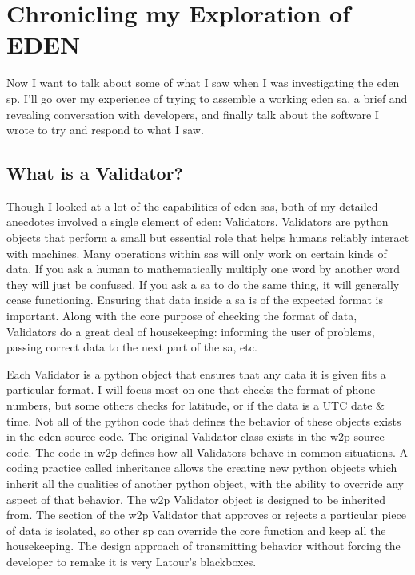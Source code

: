 \documentclass[a4paper,man,natbib,floatsintext]{apa6}
\begin{document}
  \section{Chronicling my Exploration of EDEN}
  Now I want to talk about some of what I saw when I was investigating the \acrshort{eden} \gls{sp}. I'll go over my experience of trying to assemble a working \acrshort{eden} \gls{sa}, a brief and revealing conversation with developers, and finally talk about the software I wrote to try and respond to what I saw.

  \subsection{What is a Validator?}
  Though I looked at a lot of the capabilities of \acrshort{eden} \glspl{sa}, both of my detailed anecdotes involved a single element of \acrshort{eden}: Validators. Validators are \Gls{python} objects that perform a small but essential role that helps humans reliably interact with machines. Many operations within \glspl{sa} will only work on certain kinds of data. If you ask a human to mathematically multiply one word by another word they will just be confused. If you ask a \gls{sa} to do the same thing, it will generally cease functioning. Ensuring that data inside a \gls{sa} is of the expected format is important. Along with the core purpose of checking the format of data, Validators do a great deal of housekeeping: informing the user of problems, passing correct data to the next part of the \gls{sa}, etc.

  Each Validator is a \Gls{python} object that ensures that any data it is given fits a particular format. I will focus most on one that checks the format of phone numbers, but some others checks for latitude, or if the data is a UTC date \& time. Not all of the \Gls{python} code that defines the behavior of these objects exists in the \acrshort{eden} source code. The original Validator class exists in the \gls{w2p} source code. The code in \gls{w2p} defines how all Validators behave in common situations. A coding practice called inheritance allows the creating new \Gls{python} objects which inherit all the qualities of another \Gls{python} object, with the ability to override any aspect of that behavior. The \gls{w2p} Validator object is designed to be inherited from. The section of the \gls{w2p} Validator that approves or rejects a particular piece of data is isolated, so other \gls{sp} can override the core function and keep all the housekeeping. The design approach of transmitting behavior without forcing the developer to remake it is very Latour's blackboxes\footnotemark.
\end{document}

